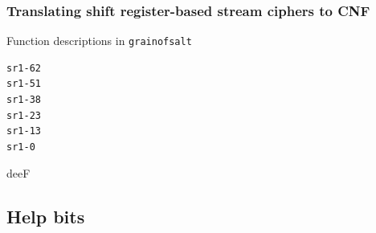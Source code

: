 \documentclass[xcolor=usenames,xcolor=svgnames,table,slidestop,compress,mathserif]{beamer}
\begin{document}
{%
}

\begin{frame}[fragile]
\frametitle{Translating shift register-based stream ciphers to CNF}

\begin{beamerboxesrounded}[shadow=true]{Function descriptions in \texttt{grainofsalt}}
\begin{verbatim}
sr1-62
sr1-51
sr1-38
sr1-23
sr1-13
sr1-0
\end{verbatim}

deeF
\end{beamerboxesrounded}
\end{frame}

\subsection{Help bits}
\end{document}
